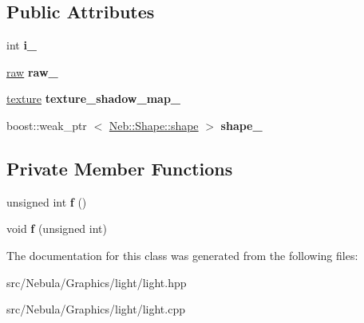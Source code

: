 \subsection*{\-Public \-Attributes}
\begin{DoxyCompactItemize}
\item 
\hypertarget{classNeb_1_1light_1_1light_a1d90e423f84e2ce61861e4e7d667a0fa}{int {\bfseries i\-\_\-}}\label{classNeb_1_1light_1_1light_a1d90e423f84e2ce61861e4e7d667a0fa}

\item 
\hypertarget{classNeb_1_1light_1_1light_ae5ddfcfae0bd6b994c5ec97d7211eeb6}{\hyperlink{classNeb_1_1light_1_1raw}{raw} {\bfseries raw\-\_\-}}\label{classNeb_1_1light_1_1light_ae5ddfcfae0bd6b994c5ec97d7211eeb6}

\item 
\hypertarget{classNeb_1_1light_1_1light_a1f0369556edb6b3211ac555d7b92c0cb}{\hyperlink{classNeb_1_1texture}{texture} {\bfseries texture\-\_\-shadow\-\_\-map\-\_\-}}\label{classNeb_1_1light_1_1light_a1f0369556edb6b3211ac555d7b92c0cb}

\item 
\hypertarget{classNeb_1_1light_1_1light_a09cd2a9721596c5ec98f5bd3d20aa1f6}{boost\-::weak\-\_\-ptr\*
$<$ \hyperlink{classNeb_1_1Shape_1_1shape}{\-Neb\-::\-Shape\-::shape} $>$ {\bfseries shape\-\_\-}}\label{classNeb_1_1light_1_1light_a09cd2a9721596c5ec98f5bd3d20aa1f6}

\end{DoxyCompactItemize}
\subsection*{\-Private \-Member \-Functions}
\begin{DoxyCompactItemize}
\item 
\hypertarget{classNeb_1_1light_1_1light_a77c268feb4c6c59c67bf4cbf898f1efa}{unsigned int {\bfseries f} ()}\label{classNeb_1_1light_1_1light_a77c268feb4c6c59c67bf4cbf898f1efa}

\item 
\hypertarget{classNeb_1_1light_1_1light_a06cd020d6488612191a2eefa295b9837}{void {\bfseries f} (unsigned int)}\label{classNeb_1_1light_1_1light_a06cd020d6488612191a2eefa295b9837}

\end{DoxyCompactItemize}


\-The documentation for this class was generated from the following files\-:\begin{DoxyCompactItemize}
\item 
src/\-Nebula/\-Graphics/light/light.\-hpp\item 
src/\-Nebula/\-Graphics/light/light.\-cpp\end{DoxyCompactItemize}
